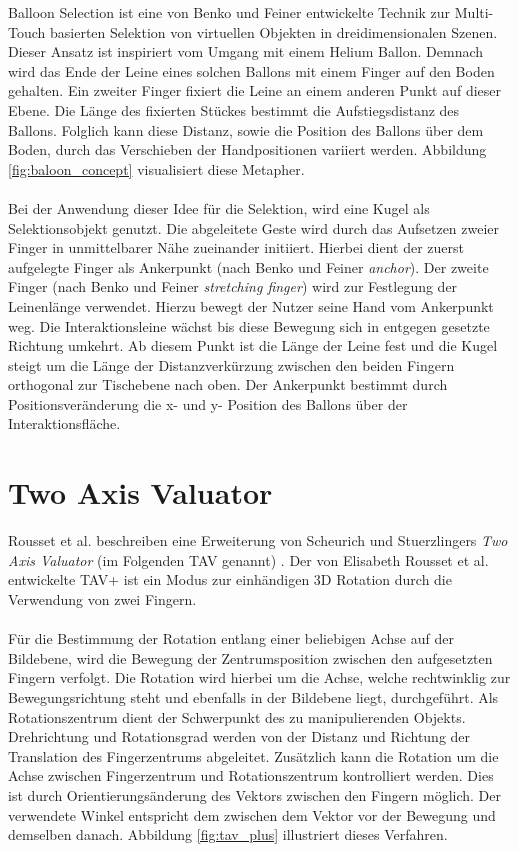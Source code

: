 Balloon Selection ist eine von Benko und Feiner \cite{benko:2007} entwickelte Technik zur Multi-Touch basierten Selektion von virtuellen Objekten in dreidimensionalen Szenen. Dieser Ansatz ist inspiriert vom Umgang mit einem Helium Ballon. Demnach wird das Ende der Leine eines solchen Ballons mit einem Finger auf den Boden gehalten. Ein zweiter Finger fixiert die Leine an einem anderen Punkt auf dieser Ebene. Die Länge des fixierten Stückes bestimmt die Aufstiegsdistanz des Ballons. Folglich kann diese Distanz, sowie die Position des Ballons über dem Boden, durch das Verschieben der Handpositionen variiert werden. Abbildung \ref{fig:baloon_concept} visualisiert diese Metapher.
\\\\
Bei der Anwendung dieser Idee für die Selektion, wird eine Kugel als Selektionsobjekt genutzt. Die abgeleitete Geste wird durch das Aufsetzen zweier Finger in unmittelbarer Nähe zueinander initiiert. Hierbei dient der zuerst aufgelegte Finger als Ankerpunkt (nach Benko und Feiner \emph{anchor}). Der zweite Finger (nach Benko und Feiner \emph{stretching finger}) wird zur Festlegung der Leinenlänge verwendet. Hierzu bewegt der Nutzer seine Hand vom Ankerpunkt weg. Die Interaktionsleine wächst bis diese Bewegung sich in entgegen gesetzte Richtung umkehrt. Ab diesem Punkt ist die Länge der Leine fest und die Kugel steigt um die Länge der Distanzverkürzung zwischen den beiden Fingern orthogonal zur Tischebene nach oben. Der Ankerpunkt bestimmt durch Positionsveränderung die x- und y- Position des Ballons über der Interaktionsfläche.


\section{Two Axis Valuator}
\label{sec:related_two_axis_valuator}

Rousset et al. beschreiben eine Erweiterung von Scheurich und Stuerzlingers \emph{Two Axis Valuator} (im Folgenden TAV genannt) \cite{scheurich:2013,rousset:2014}. Der von Elisabeth Rousset et al. entwickelte TAV+ ist ein Modus zur einhändigen 3D Rotation durch die Verwendung von zwei Fingern. 
\\\\
Für die Bestimmung der Rotation entlang einer beliebigen Achse auf der Bildebene, wird die Bewegung der Zentrumsposition zwischen den aufgesetzten Fingern verfolgt. Die Rotation wird hierbei um die Achse, welche rechtwinklig zur Bewegungsrichtung steht und ebenfalls in der Bildebene liegt, durchgeführt. Als Rotationszentrum dient der Schwerpunkt des zu manipulierenden Objekts. Drehrichtung und Rotationsgrad werden von der Distanz und Richtung der Translation des Fingerzentrums abgeleitet. Zusätzlich kann die Rotation um die Achse zwischen Fingerzentrum und Rotationszentrum kontrolliert werden. Dies ist durch Orientierungsänderung des Vektors zwischen den Fingern möglich. Der verwendete Winkel entspricht dem zwischen dem Vektor vor der Bewegung und demselben danach. Abbildung \ref{fig:tav_plus} illustriert dieses Verfahren.

